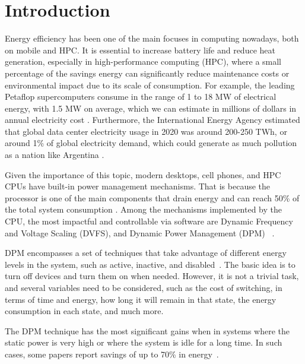 \section{Introduction} \label{sec:introduction}

Energy efficiency has been one of the main focuses in computing nowadays, both on mobile and HPC. It is essential to increase battery life and reduce heat generation, especially in high-performance computing (HPC), where a small percentage of the savings energy can significantly reduce maintenance costs or environmental impact due to its scale of consumption. For example, the leading Petaflop supercomputers consume in the range of 1 to 18 MW of electrical energy, with 1.5 MW on average, which we can estimate in millions of dollars in annual electricity cost \cite{Group2012HandbookSahni}. Furthermore, the International Energy Agency \cite{iea_2021} estimated that global data center electricity usage in 2020 was around 200-250 TWh, or around 1\% \cite{Corcoran2017EmergingICT} of global electricity demand, which could generate as much pollution as a nation like Argentina \cite{Mathew2012Energy-awareNetworks}.

Given the importance of this topic, modern desktops, cell phones, and HPC CPUs have built-in power management mechanisms. That is because the processor is one of the main components that drain energy and can reach 50\% of the total system consumption \cite{Fan2007, Barroso2007TheComputing, Malladi2012TowardsDRAM}. Among the mechanisms implemented by the CPU, the most impactful and controllable via software are Dynamic Frequency and Voltage Scaling (DVFS), and Dynamic Power Management (DPM) ~\cite{Rotem2012Power-managementBridge, Brown2005, Hackenberg2015}.

DPM encompasses a set of techniques that take advantage of different energy levels in the system, such as active, inactive, and disabled~\cite{CARDOSO201717, Shuja2012Energy-efficientCenters, Benini2000AManagement}. The basic idea is to turn off devices and turn them on when needed. However, it is not a trivial task, and several variables need to be considered, such as the cost of switching, in terms of time and energy, how long it will remain in that state, the energy consumption in each state, and much more.

The DPM technique has the most significant gains when in systems where the static power is very high or where the system is idle for a long time. In such cases, some papers report savings of up to 70\% in energy~\cite{Shuja2012Energy-efficientCenters, Benini2000AManagement}.

